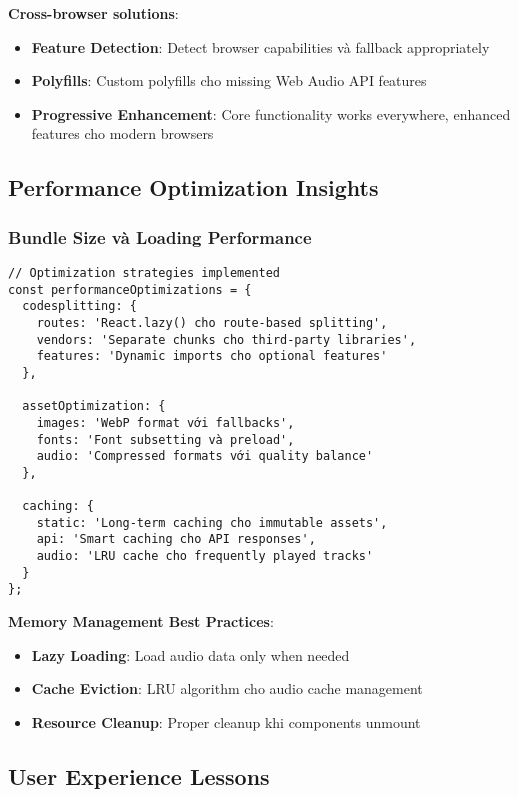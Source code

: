 \documentclass[12pt,a4paper]{article}
\begin{document}
\textbf{Cross-browser solutions}:
\begin{itemize}
\item \textbf{Feature Detection}: Detect browser capabilities và fallback appropriately
\item \textbf{Polyfills}: Custom polyfills cho missing Web Audio API features
\item \textbf{Progressive Enhancement}: Core functionality works everywhere, enhanced features cho modern browsers
\end{itemize}

\subsection{Performance Optimization Insights}

\subsubsection{Bundle Size và Loading Performance}

\begin{lstlisting}[caption={Optimization strategies implemented}]
// Optimization strategies implemented
const performanceOptimizations = {
  codesplitting: {
    routes: 'React.lazy() cho route-based splitting',
    vendors: 'Separate chunks cho third-party libraries',
    features: 'Dynamic imports cho optional features'
  },
  
  assetOptimization: {
    images: 'WebP format với fallbacks',
    fonts: 'Font subsetting và preload',
    audio: 'Compressed formats với quality balance'
  },
  
  caching: {
    static: 'Long-term caching cho immutable assets',
    api: 'Smart caching cho API responses',
    audio: 'LRU cache cho frequently played tracks'
  }
};
\end{lstlisting}

\textbf{Memory Management Best Practices}:
\begin{itemize}
\item \textbf{Lazy Loading}: Load audio data only when needed
\item \textbf{Cache Eviction}: LRU algorithm cho audio cache management
\item \textbf{Resource Cleanup}: Proper cleanup khi components unmount
\end{itemize}

\subsection{User Experience Lessons}
\end{document}
